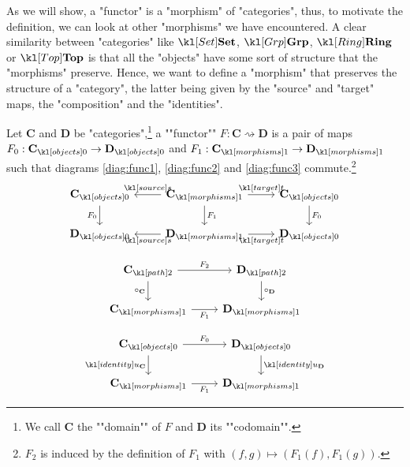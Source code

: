 \documentclass[main.tex]{subfiles}
\begin{document}
As we will show, a "functor" is a "morphism" of "categories", thus, to motivate the definition, we can look at other "morphisms" we have encountered. A clear similarity between "categories" like $\catSet$, $\catGrp$, $\catRing$ or $\catTop$ is that all the "objects" have some sort of structure that the "morphisms" preserve. Hence, we want to define a "morphism" that preserves the structure of a "category", the latter being given by the "source" and "target" maps, the "composition" and the "identities".
\begin{defn}[Functor]\label{defn:func}
	\AP Let $\mathbf{C}$ and $\mathbf{D}$ be "categories",\footnote{We call $\mathbf{C}$ the ""domain"" of $F$ and $\mathbf{D}$ its ""codomain"".} a ""functor"" $F: \mathbf{C} \rightsquigarrow \mathbf{D}$ is a pair of maps $F_0:\obj{\mathbf{C}} \rightarrow \obj{\mathbf{D}}$ and $F_1:\mor{\mathbf{C}} \rightarrow \mor{\mathbf{D}}$ such that diagrams \eqref{diag:func1}, \eqref{diag:func2} and \eqref{diag:func3} commute.\footnote{$F_2$ is induced by the definition of $F_1$ with $(f,g) \mapsto (F_1(f), F_1(g))$.}
	\begin{equation}\label{diag:func1}
		\begin{tikzcd}
			\obj{\mathbf{C}} \arrow[d, "F_0"'] & \mor{\mathbf{C}} \arrow[d, "F_1"] \arrow[l, "\source"'] \arrow[r, "\target"] & \obj{\mathbf{C}} \arrow[d, "F_0"] \\
			\obj{\mathbf{D}} & \mor{\mathbf{D}} \arrow[l, "\source"] \arrow[r, "\target"'] & \obj{\mathbf{D}}
		\end{tikzcd}
	\end{equation}
	\begin{minipage}{0.49\textwidth}
		\begin{equation}\label{diag:func2}
		\begin{tikzcd}
			\mortwo{\mathbf{C}} \arrow[d, "\circ_\mathbf{C}"'] \arrow[r, "F_2"] & \mortwo{\mathbf{D}} \arrow[d, "\circ_\mathbf{D}"] \\
			\mor{\mathbf{C}} \arrow[r, "F_1"'] & \mor{\mathbf{D}}
		\end{tikzcd}
		\end{equation}
	\end{minipage}
	\begin{minipage}{0.49\textwidth}
			\begin{equation}\label{diag:func3}
		\begin{tikzcd}
			\obj{\mathbf{C}} \arrow[d, "\idu_{\mathbf{C}}"'] \arrow[r, "F_0"] & \obj{\mathbf{D}} \arrow[d, "\idu_{\mathbf{D}}"] \\
			\mor{\mathbf{C}} \arrow[r, "F_1"'] & \mor{\mathbf{D}}
		\end{tikzcd}
		\end{equation}
	\end{minipage}
\end{defn}
\end{document}
